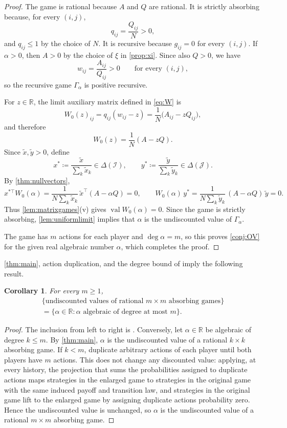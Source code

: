 \documentclass[11pt, a4paper]{article}
\theoremstyle{plain}
\newtheorem{corollary}{Corollary}
\theoremstyle{definition}
\newcommand{\R}{\mathbb{R}}
\DeclareMathOperator{\val}{val}
\newcommand{\defas}{\coloneqq}
\newcommand{\I}{\mathcal{I}}
\newcommand{\J}{\mathcal{J}}
\begin{document}
\begin{proof}
The game is rational because $A$ and $Q$ are rational. It is strictly absorbing because, for every $(i,j)$,
\[
q_{ij}=\frac{Q_{ij}}{N}>0 ,
\]
and $q_{ij}\leq1$ by the choice of $N$. It is recursive because $g_{ij}=0$ for every $(i,j)$.
If $\alpha>0$, then $A>0$ by the choice of $\xi$ in \cref{prop:xi}. Since also $Q>0$, we have
\[
w_{ij}=\frac{A_{ij}}{Q_{ij}}>0
\qquad\text{for every }(i,j),
\]
so the recursive game $\Gamma_\alpha$ is positive recursive.

For $z\in\R$, the limit auxiliary matrix defined in \cref{eq:W} is
\[
W_0(z)_{ij}=q_{ij}(w_{ij}-z)=\frac1N\bigl(A_{ij}-zQ_{ij}\bigr),
\]
and therefore
\[
W_0(z)=\frac1N(A-zQ).
\]
Since $\tilde x,\tilde y>0$, define
\[
x^*\defas \frac{\tilde x}{\sum_k\tilde x_k}\in\Delta(\I),
\qquad
y^*\defas \frac{\tilde y}{\sum_k\tilde y_k}\in\Delta(\J).
\]
By \cref{thm:nullvectors},
\[
x^{*\top}W_0(\alpha)=\frac{1}{N\sum_k\tilde x_k}\,\tilde x^{\top}(A-\alpha Q)=0,
\qquad
W_0(\alpha)\,y^*=\frac{1}{N\sum_k\tilde y_k}\,(A-\alpha Q)\,\tilde y=0 .
\]
Thus \cref{lem:matrixgames}(v) gives $\val W_0(\alpha)=0$.
Since the game is strictly absorbing, \cref{lem:uniformlimit} implies that $\alpha$ is the undiscounted value of $\Gamma_\alpha$.

The game has $m$ actions for each player and $\deg\alpha=m$, so this proves \cref{conj:OV} for the given real algebraic number $\alpha$, which completes the proof.
\end{proof}

\cref{thm:main}, action duplication, and the degree bound of \citet[Proposition 1]{OB21} imply the following result.

\begin{corollary}\label{cor:char}
For every $m\geq1$,
\begin{multline*}
\bigl\{\text{undiscounted values of rational $m\times m$ absorbing games}\bigr\}\\
=\bigl\{\alpha\in\R:\alpha\text{ algebraic of degree at most }m\bigr\}.
\end{multline*}
\end{corollary}

\begin{proof}
The inclusion from left to right is \citet[Proposition 1]{OB21}. Conversely, let $\alpha\in\R$ be algebraic of degree $k\leq m$. By \cref{thm:main}, $\alpha$ is the undiscounted value of a rational $k\times k$ absorbing game. If $k<m$, duplicate arbitrary actions of each player until both players have $m$ actions. This does not change any discounted value: applying, at every history, the projection that sums the probabilities assigned to duplicate actions maps strategies in the enlarged game to strategies in the original game with the same induced payoff and transition law, and strategies in the original game lift to the enlarged game by assigning duplicate actions probability zero. Hence the undiscounted value is unchanged, so $\alpha$ is the undiscounted value of a rational $m\times m$ absorbing game.
\end{proof}
\end{document}
